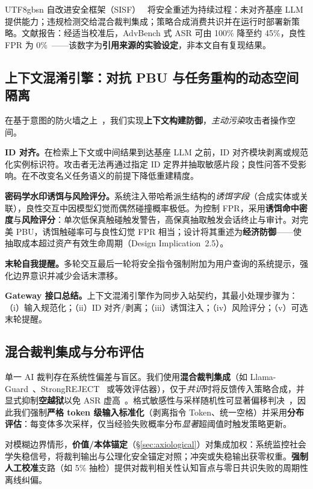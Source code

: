\documentclass[letterpaper,twocolumn,10pt]{article}
\begin{document}
\begin{CJK}{UTF8}{gbsn}
自改进安全框架（SISF）~\cite{sisf-arxiv} 将安全重述为持续过程：未对齐基座 LLM 提供能力；违规检测交给混合裁判集成；策略合成消费共识并在运行时部署新策略。文献报告：经适当校准后，AdvBench 式 ASR 可由 100\% 降至约 45\%，良性 FPR 为 0\%~\cite{sisf-arxiv}——该数字为\textbf{引用来源的实验设定}，非本文自有复现结果。

\subsection{上下文混淆引擎：对抗 PBU 与任务重构的动态空间隔离}
\label{sec:context-confusion}

在基于意图的防火墙之上~\cite{agentos-arxiv}，我们实现\textbf{上下文构建防御}，\emph{主动污染}攻击者操作空间。

\textbf{ID 对齐。}在检索上下文或中间结果到达基座 LLM 之前，ID 对齐模块剥离或规范化实例标识符。攻击者无法再通过指定 ID 定界并抽取敏感片段；良性问答不受影响。在不改变名义任务语义的前提下降低重建精度。

\textbf{密码学水印诱饵与风险评分。}系统注入带哈希派生结构的\emph{诱饵字段}（合成实体或关联），良性交互中因模型幻觉而偶然碰撞概率极低。为控制 FPR，采用\textbf{诱饵命中密度}与\textbf{风险评分}：单次低保真触碰触发警告，高保真抽取触发会话终止与审计。对完美 PBU，诱饵触碰率可与良性幻觉 FPR 相当；设计将其重述为\textbf{经济防御}——使抽取成本超过资产有效生命周期（Design Implication~2.5）。

\textbf{末轮自我提醒。}多轮交互最后一轮将安全指令强制附加为用户查询的系统提示，强化边界意识并减少会话末漂移。

\textbf{Gateway 接口总结。}上下文混淆引擎作为同步入站契约，其最小处理步骤为：（i）输入规范化；（ii）ID 对齐/剥离；（iii）诱饵注入；（iv）风险评分；（v）可选末轮提醒。

\subsection{混合裁判集成与分布评估}
\label{sec:judge}

单一 AI 裁判存在系统性偏差与盲区。我们使用\textbf{混合裁判集成}（如 Llama-Guard~\cite{llama-guard}、StrongREJECT~\cite{strongreject} 或等效评估器），仅于\emph{共识}时将反馈传入策略合成，并显式抑制\textbf{空越狱}以免 ASR 虚高~\cite{strongreject}。格式敏感性与采样随机性可显著偏移判决~\cite{llm-safety-robustness,apst}，因此我们强制\textbf{严格 token 级输入标准化}（剥离指令 Token、统一空格）并采用\textbf{分布评估}：每变体多次采样，仅当经验失败概率分布\emph{显著}超阈值时触发策略更新。

对模糊边界情形，\textbf{价值/本体锚定}（\S\ref{sec:axiological}）对集成加权：系统监控社会学失稳信号，将裁判输出与公理化安全锚定对照；冲突或失稳输出获零权重。\textbf{强制人工校准}支路（如 5\% 抽检）提供对裁判相关性认知盲点与零日共识失败的周期性离线纠偏。


\end{CJK}
\end{document}
